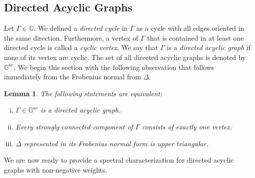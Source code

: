 \documentclass{article}
\newtheorem{lemma}[theorem]{Lemma}
\begin{document}
\subsection{Directed Acyclic Graphs}
Let $\Gamma\in\mathbb{G}$. 
We defined a \emph{directed cycle} in $\Gamma$ as a cycle with all edges oriented in the same direction. 
Furthermore, a vertex of $\Gamma$ that is contained in at least one directed cycle is called a \emph{cyclic vertex}. 
We say that $\Gamma$ is a \emph{directed acyclic graph} if none of its vertex are cyclic.
The set of all directed acyclic graphs is denoted by $\mathbb{G}^{ac}$.
We begin this section with the following observation that follows immediately from the Frobenius normal from $\Delta$.

\begin{lemma}\label{lem:acyclic}
The following statements are equivalent:
\begin{enumerate}[i.]
\item	$\Gamma\in\mathbb{G}^{ac}$ is a directed acyclic graph.
\item	Every strongly connected component of $\Gamma$ consists of exactly one vertex.
\item	$\Delta$ represented in its Frobenius normal form is upper triangular. 
\end{enumerate}
\end{lemma}

We are now ready to provide a spectral characterization for directed acyclic graphs with non-negative weights.
\end{document}
